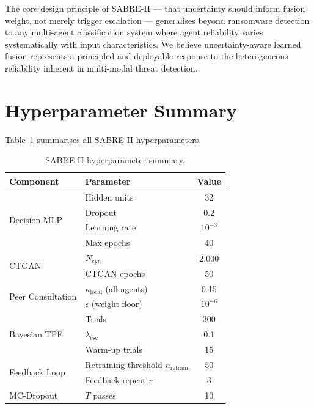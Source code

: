 \documentclass[journal]{IEEEtran}
\newcommand{\Nsynth}{N_{\mathrm{syn}}}
\begin{document}
The core design principle of SABRE-II --- that uncertainty should
inform fusion weight, not merely trigger escalation --- generalises
beyond ransomware detection to any multi-agent classification system
where agent reliability varies systematically with input characteristics.
We believe uncertainty-aware learned fusion represents a
principled and deployable response to the heterogeneous reliability
inherent in multi-modal threat detection.


\appendix
\section{Hyperparameter Summary}
\label{app:hyperparams}

Table~\ref{tab:hyperparams} summarises all SABRE-II hyperparameters.

\begin{table}[H]
\centering
\caption{SABRE-II hyperparameter summary.}
\label{tab:hyperparams}
\setlength{\tabcolsep}{4pt}
\begin{tabular}{llc}
\toprule
Component & Parameter & Value \\
\midrule
\multirow{4}{*}{Decision MLP}
  & Hidden units        & 32 \\
  & Dropout             & 0.2 \\
  & Learning rate       & $10^{-3}$ \\
  & Max epochs          & 40 \\
\midrule
\multirow{2}{*}{CTGAN}
  & $\Nsynth$           & 2,000 \\
  & CTGAN epochs        & 50 \\
\midrule
\multirow{2}{*}{Peer Consultation}
  & $\kappa_{\mathrm{local}}$ (all agents) & 0.15 \\
  & $\epsilon$ (weight floor)              & $10^{-6}$ \\
\midrule
\multirow{3}{*}{Bayesian TPE}
  & Trials              & 300 \\
  & $\lambda_{\mathrm{esc}}$ & 0.1 \\
  & Warm-up trials      & 15 \\
\midrule
\multirow{2}{*}{Feedback Loop}
  & Retraining threshold $n_{\mathrm{retrain}}$ & 50 \\
  & Feedback repeat $r$  & 3 \\
\midrule
MC-Dropout & $T$ passes & 10 \\
\bottomrule
\end{tabular}
\end{table}



\end{document}
